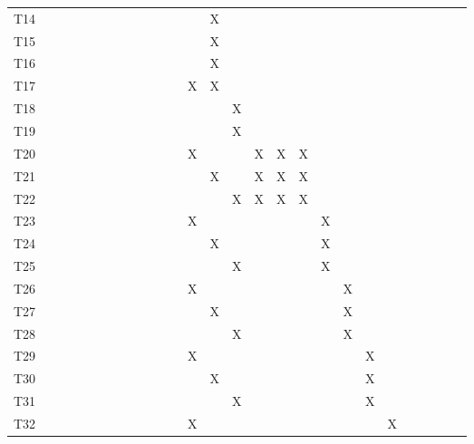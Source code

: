 \documentclass[]{article}
\begin{document}
\begin{longtable}[l]{lllllllllllllllllllllllllll}
T14 &  &  &  &  &  &  &  &  &  &  &  &  & X &  &  &  &  &  &  &  &  &  &  &  &  & \\
\rowcolor{gray!6}  T15 &  &  &  &  &  &  &  &  &  &  &  &  & X &  &  &  &  &  &  &  &  &  &  &  &  & \\
\addlinespace
T16 &  &  &  &  &  &  &  &  &  &  &  &  & X &  &  &  &  &  &  &  &  &  &  &  &  & \\
\rowcolor{gray!6}  T17 &  &  &  &  &  &  &  &  &  &  &  & X & X &  &  &  &  &  &  &  &  &  &  &  &  & \\
T18 &  &  &  &  &  &  &  &  &  &  &  &  &  & X &  &  &  &  &  &  &  &  &  &  &  & \\
\rowcolor{gray!6}  T19 &  &  &  &  &  &  &  &  &  &  &  &  &  & X &  &  &  &  &  &  &  &  &  &  &  & \\
T20 &  &  &  &  &  &  &  &  &  &  &  & X &  &  & X & X & X &  &  &  &  &  &  &  &  & \\
\addlinespace
\rowcolor{gray!6}  T21 &  &  &  &  &  &  &  &  &  &  &  &  & X &  & X & X & X &  &  &  &  &  &  &  &  & \\
T22 &  &  &  &  &  &  &  &  &  &  &  &  &  & X & X & X & X &  &  &  &  &  &  &  &  & \\
\rowcolor{gray!6}  T23 &  &  &  &  &  &  &  &  &  &  &  & X &  &  &  &  &  & X &  &  &  &  &  &  &  & \\
T24 &  &  &  &  &  &  &  &  &  &  &  &  & X &  &  &  &  & X &  &  &  &  &  &  &  & \\
\rowcolor{gray!6}  T25 &  &  &  &  &  &  &  &  &  &  &  &  &  & X &  &  &  & X &  &  &  &  &  &  &  & \\
\addlinespace
T26 &  &  &  &  &  &  &  &  &  &  &  & X &  &  &  &  &  &  & X &  &  &  &  &  &  & \\
\rowcolor{gray!6}  T27 &  &  &  &  &  &  &  &  &  &  &  &  & X &  &  &  &  &  & X &  &  &  &  &  &  & \\
T28 &  &  &  &  &  &  &  &  &  &  &  &  &  & X &  &  &  &  & X &  &  &  &  &  &  & \\
\rowcolor{gray!6}  T29 &  &  &  &  &  &  &  &  &  &  &  & X &  &  &  &  &  &  &  & X &  &  &  &  &  & \\
T30 &  &  &  &  &  &  &  &  &  &  &  &  & X &  &  &  &  &  &  & X &  &  &  &  &  & \\
\addlinespace
\rowcolor{gray!6}  T31 &  &  &  &  &  &  &  &  &  &  &  &  &  & X &  &  &  &  &  & X &  &  &  &  &  & \\
T32 &  &  &  &  &  &  &  &  &  &  &  & X &  &  &  &  &  &  &  &  & X &  &  &  &  & \\

\end{longtable}
\end{document}
